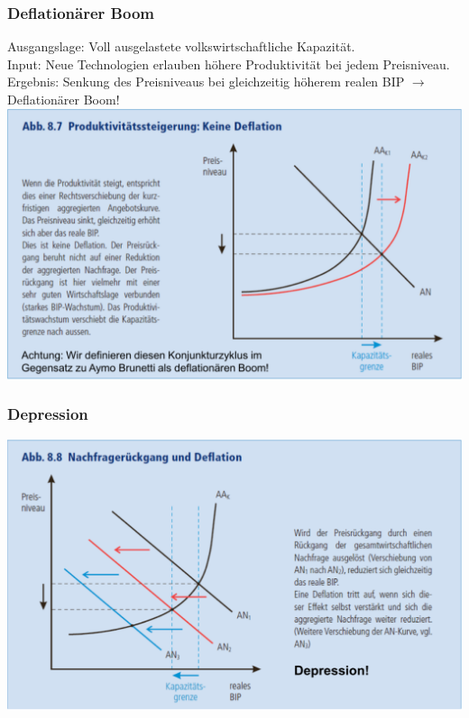 \begin{multicols}{2}
\subsubsection{Deflationärer Boom}
Ausgangslage: Voll ausgelastete volkswirtschaftliche Kapazität.\\
Input: Neue Technologien erlauben höhere Produktivität bei jedem Preisniveau.\\
Ergebnis: Senkung des Preisniveaus bei gleichzeitig höherem realen BIP $\rightarrow$ Deflationärer Boom!
\includegraphics[width=\linewidth]{images/produktivitaetssteigerung.png}
\columnbreak
\subsubsection{Depression}
\includegraphics[width=\linewidth]{images/nachfragerueckgang.png}
\end{multicols}

